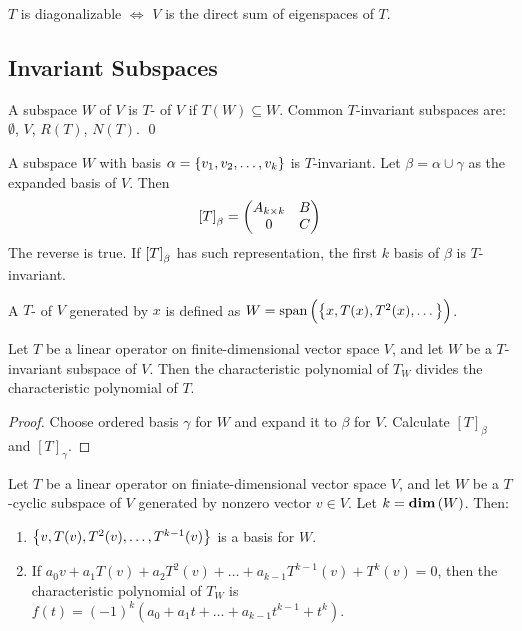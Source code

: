 \begin{theorem}
    $T$ is diagonalizable $\iff$ $V$ is the direct sum of eigenspaces of $T$.
\end{theorem}


\subsection{Invariant Subspaces}

\begin{definition}
    A subspace $W$ of $V$ is $T$- of $V$ if $T(W) \subseteq W$.
    Common $T$-invariant subspaces are: $\emptyset$, $V$, $R(T)$, $N(T)$.
    \qed
\end{definition}

\begin{theorem}
    A subspace $W$ with basis $\alpha = \set{v_1, v_2, \dots, v_k}$ is $T$-invariant. Let $\beta = \alpha \cup \gamma$ as the expanded basis of $V$. Then
    \begin{equation}
        \coordinate{T}_\beta = \begin{pmatrix}
            A_{k \times k} & B \\
            0 & C
        \end{pmatrix}
    \end{equation}
    The reverse is true. If $\coordinate{T}_\beta$  has such representation, the first $k$ basis of $\beta$ is $T$-invariant. 
\end{theorem}



\begin{definition}
    A $T$- of $V$ generated by $x$ is defined as $W=\text{span} \left(  \set{x, T(x), T^2(x), \dots} \right)$.
\end{definition}

\begin{theorem}
    Let $T$ be a linear operator on finite-dimensional vector space $V$, and let $W$ be a $T$-invariant subspace of $V$. Then the characteristic polynomial of $T_W$ divides the characteristic polynomial of $T$.
\end{theorem}

\begin{proof}
    Choose ordered basis $\gamma$ for $W$ and expand it to $\beta$ for $V$. Calculate $[T]_\beta$ and $[T]_\gamma$.
\end{proof}


\begin{theorem}
    Let $T$ be a linear operator on finiate-dimensional vector space $V$, and let $W$ be a $T$-cyclic subspace of $V$ generated by nonzero vector $v \in V$. Let $k = \displaystyle \mathbf{dim}\left( W \right)$. Then:
    \begin{enumerate}
        \item $\set{v, T(v), T^2(v), \dots, T^{k-1}(v)}$ is a basis for $W$.
        \item If $a_0 v + a_1 T(v) + a_2 T^2(v) + \dots + a_{k-1} T^{k-1}(v) + T^k(v) = 0$, then the characteristic polynomial of $T_W$ is $f(t) = (-1)^k (a_0 + a_1 t + \dots + a_{k-1} t^{k-1} + t^k)$.
    \end{enumerate}
\end{theorem}

